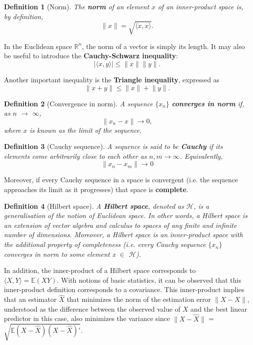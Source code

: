 \documentclass{article}
\newtheorem{defn}{Definition}
\begin{document}
\begin{defn}[Norm]
The \textbf{norm} of an element $x$ of an inner-product space is, by definition, 
\[
\lVert {x} \rVert = \sqrt{\langle x,x \rangle}.
\]
\end{defn}

In the Euclidean space $\mathbb{R}^n$, the norm of a vector is simply its length. It may also be useful to introduce the \textbf{Cauchy-Schwarz inequality}: 
\[
\left|\langle x,y \rangle\right| \leqslant \lVert {x} \rVert \lVert {y} \rVert.
\]

Another important inequality is the \textbf{Triangle inequality}, expressed as
\[
\lVert x + y \rVert \leqslant \lVert {x} \rVert + \lVert {y} \rVert.
\]

\begin{defn}[Convergence in norm]
A sequence $\{x_n\}$ \textbf{converges in norm} if, as  $n$ $\rightarrow$ $\infty$, 
\[
\lVert x_n - x \rVert \rightarrow 0, 
\] where $x$ is known as the limit of the sequence. \newline
\end{defn}

\begin{defn}[Cauchy sequence]
A sequence is said to be \textbf{Cauchy} if its elements come arbitrarily close to each other as $n,m \rightarrow \infty$. Equivalently,
\[
\lVert x_n - x_m \rVert \rightarrow 0 
\]
\end{defn}

Moreover, if every Cauchy sequence in a space is convergent (i.e. the sequence approaches its limit as it progresses) that space is \textbf{complete}. \newline

\begin{defn}[Hilbert space]
A \textbf{Hilbert space}, denoted as $\mathscr{H}$,  is a generalisation of the notion of Euclidean space. In other words, a Hilbert space is an extension of vector algebra and calculus to spaces of any finite and infinite number of dimensions. Moreover, a Hilbert space is an inner-product space with the additional property of completeness (i.e. every Cauchy sequence $\{x_n\}$ converges in norm to some element x $\in$ $\mathscr{H}$). 
\end{defn}

In addition, the inner-product of a Hilbert space corresponds to $\langle X, Y \rangle = \mathbb E(XY)$. With notions of basic statistics, it can be observed that this inner-product definition corresponds to a covariance. This inner-product implies that an estimator $\hat{X}$ that minimizes the norm of the estimation error $\lVert X - \hat{X}\rVert$, understood as the difference between the observed value of $X$ and the best linear predictor in this case, also minimizes the variance since $\lVert X - \hat{X}\rVert$ = $\sqrt{\mathbb E(X - \hat{X})(X - \hat{X})'}$. \newline
\end{document}
